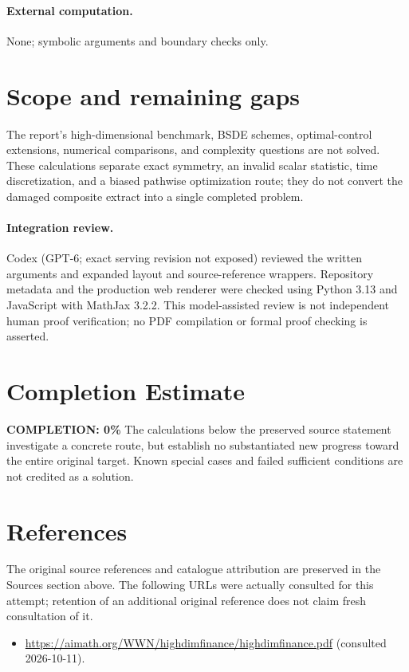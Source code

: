 \documentclass[11pt]{article}
\begin{document}
\paragraph{External computation.} None; symbolic arguments and boundary checks only.
\section{Scope and remaining gaps}
The report's high-dimensional benchmark, BSDE schemes, optimal-control extensions, numerical comparisons, and complexity questions are not solved. These calculations separate exact symmetry, an invalid scalar statistic, time discretization, and a biased pathwise optimization route; they do not convert the damaged composite extract into a single completed problem.
\paragraph{Integration review.} Codex (GPT-6; exact serving revision not exposed) reviewed the written arguments and expanded layout and source-reference wrappers. Repository metadata and the production web renderer were checked using Python 3.13 and JavaScript with MathJax 3.2.2. This model-assisted review is not independent human proof verification; no PDF compilation or formal proof checking is asserted.

\section{Completion Estimate}
\noindent\textbf{COMPLETION: 0\%}
The calculations below the preserved source statement investigate a concrete route,
but establish no substantiated new progress toward the entire original target.
Known special cases and failed sufficient conditions are not credited as a solution.
\section{References}
The original source references and catalogue attribution are preserved in the
Sources section above. The following URLs were actually consulted for this attempt;
retention of an additional original reference does not claim fresh consultation of it.
\begin{itemize}
\item \url{https://aimath.org/WWN/highdimfinance/highdimfinance.pdf} (consulted 2026-10-11). 
\end{itemize}
\end{document}
